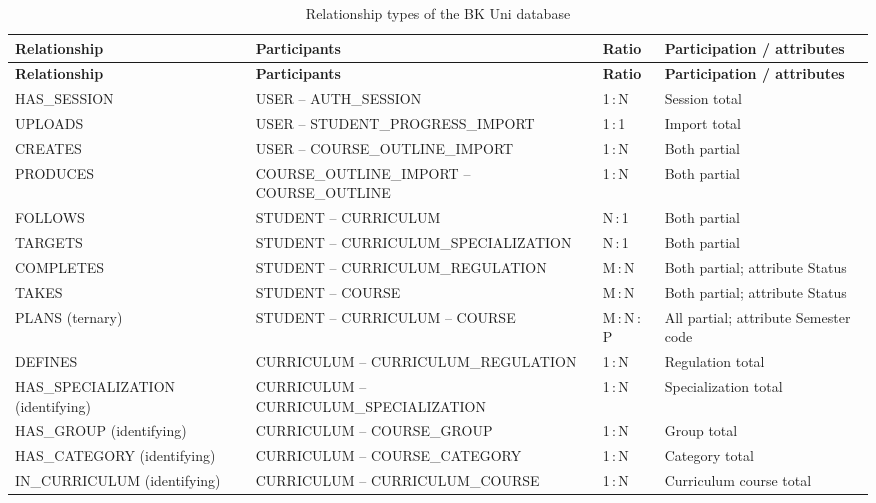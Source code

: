 \begingroup\small
\begin{longtable}{|p{}|p{}|p{}|p{}|}
\caption{Relationship types of the BK Uni database}\label{tab:db-relationships}\\
\hline
\textbf{Relationship} & \textbf{Participants} & \textbf{Ratio} & \textbf{Participation / attributes} \\
\hline
\endfirsthead
\hline
\textbf{Relationship} & \textbf{Participants} & \textbf{Ratio} & \textbf{Participation / attributes} \\
\hline
\endhead
HAS\_\allowbreak{}SESSION & USER -- AUTH\_\allowbreak{}SESSION & 1\,:\,N & Session total \\
\hline
UPLOADS & USER -- STUDENT\_\allowbreak{}PROGRESS\_\allowbreak{}IMPORT & 1\,:\,1 & Import total \\
\hline
CREATES & USER -- COURSE\_\allowbreak{}OUTLINE\_\allowbreak{}IMPORT & 1\,:\,N & Both partial \\
\hline
PRODUCES & COURSE\_\allowbreak{}OUTLINE\_\allowbreak{}IMPORT -- COURSE\_\allowbreak{}OUTLINE & 1\,:\,N & Both partial \\
\hline
FOLLOWS & STUDENT -- CURRICULUM & N\,:\,1 & Both partial \\
\hline
TARGETS & STUDENT -- CURRICULUM\_\allowbreak{}SPECIALIZATION & N\,:\,1 & Both partial \\
\hline
COMPLETES & STUDENT -- CURRICULUM\_\allowbreak{}REGULATION & M\,:\,N & Both partial; attribute Status \\
\hline
TAKES & STUDENT -- COURSE & M\,:\,N & Both partial; attribute Status \\
\hline
PLANS (ternary) & STUDENT -- CURRICULUM -- COURSE & M\,:\,N\,:\,P & All partial; attribute Semester code \\
\hline
DEFINES & CURRICULUM -- CURRICULUM\_\allowbreak{}REGULATION & 1\,:\,N & Regulation total \\
\hline
HAS\_\allowbreak{}SPECIALIZATION (identifying) & CURRICULUM -- CURRICULUM\_\allowbreak{}SPECIALIZATION & 1\,:\,N & Specialization total \\
\hline
HAS\_\allowbreak{}GROUP (identifying) & CURRICULUM -- COURSE\_\allowbreak{}GROUP & 1\,:\,N & Group total \\
\hline
HAS\_\allowbreak{}CATEGORY (identifying) & CURRICULUM -- COURSE\_\allowbreak{}CATEGORY & 1\,:\,N & Category total \\
\hline
IN\_\allowbreak{}CURRICULUM (identifying) & CURRICULUM -- CURRICULUM\_\allowbreak{}COURSE & 1\,:\,N & Curriculum course total \\

\end{longtable}
